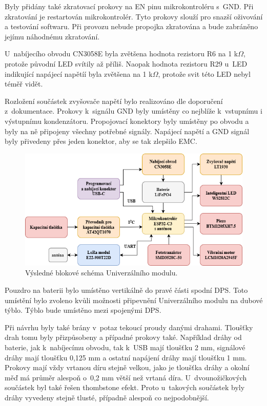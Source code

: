 Byly přidány také zkratovací prokovy na EN pinu mikrokontroléru s~GND. Při zkratování je restartován mikrokontrolér. Tyto prokovy slouží pro snazší oživování a testování softwaru. Při provozu nebude propojka 
zkratována a bude zabráněno jejímu náhodnému zkratování. 

U~nabíjecího obvodu CN3058E byla zvětšena hodnota rezistoru R6 na 1 k$\Omega$, protože původní LED svítily až příliš. Naopak hodnota rezistoru R29 u~LED indikující napájecí napětíí byla zvětšena na 1 k$\Omega$, 
protože svit této LED nebyl téměř vidět. 

Rozložení součástek zvyšovače napětí bylo realizováno dle doporučení z~dokumentace. Prokovy k~signálu GND byly umístěny co nejblíže k~vstupnímu i výstupnímu kondenzátoru. Propojovací konektory byly 
umístěny po obvodu a byly na ně připojeny všechny potřebné signály. Napájecí napětí a GND signál byly přivedeny přes jeden konektor, aby se tak zlepšilo EMC. 

\begin{figure}[!h]
  \begin{center}
    \includegraphics[scale=0.65]{obrazky/blokove_schema_finalni_verze.png}
  \end{center}
  \caption[Výsledné blokové schéma Univerzálního modulu]{Výsledné blokové schéma Univerzálního modulu.}
\end{figure}

Pouzdro na baterii bylo umístěno vertikálně do pravé části spodní DPS. Toto umístění bylo zvoleno kvůli možnosti připevnění Univerzálního modulu na dubové týblo. Týblo bude umístěno mezi spojenými DPS. 

Při návrhu byly také brány v~potaz tekoucí proudy danými drahami. Tloušťky drah tomu byly přizpůsobeny a případné prokovy také. Například dráhy od baterie, jak k~nabíjecímu obvodu, tak k~USB mají tloušťku
2 mm, signálové dráhy mají tloušťku 0,125 mm a ostatní napájení dráhy mají tloušťku 1 mm. Prokovy mají vždy vrtanou díru stejně velkou, jako je tloušťka dráhy a okolní měď má průměr alespoň o~0,2 mm větší 
než vrtaná díra. U~dvounožičkových součástek byl také řešen thombstone efekt. Proto u~takových součástek byly dráhy vyvedeny stejně tlusté, případně alespoň co nejpodobnější. 
 
